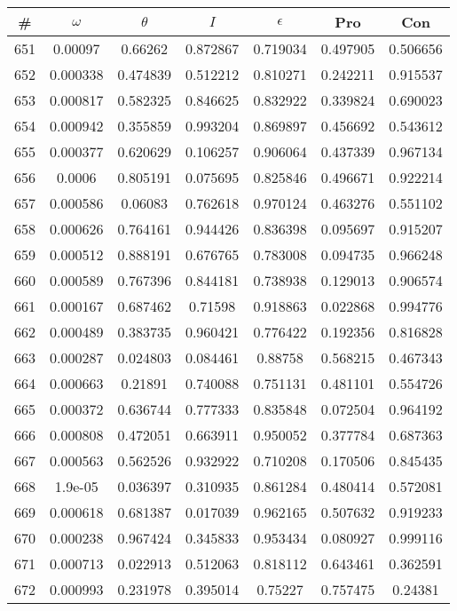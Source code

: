 \newpage
\begin{table}
\begin{tabular}{c|c|c|c|c|c|c}
\# & $\omega$ & $\theta$ & $I$ & $\epsilon$ & Pro & Con\\
\hline
651 & 0.00097 & 0.66262 & 0.872867 & 0.719034 & 0.497905 & 0.506656\\
652 & 0.000338 & 0.474839 & 0.512212 & 0.810271 & 0.242211 & 0.915537\\
653 & 0.000817 & 0.582325 & 0.846625 & 0.832922 & 0.339824 & 0.690023\\
654 & 0.000942 & 0.355859 & 0.993204 & 0.869897 & 0.456692 & 0.543612\\
655 & 0.000377 & 0.620629 & 0.106257 & 0.906064 & 0.437339 & 0.967134\\
656 & 0.0006 & 0.805191 & 0.075695 & 0.825846 & 0.496671 & 0.922214\\
657 & 0.000586 & 0.06083 & 0.762618 & 0.970124 & 0.463276 & 0.551102\\
658 & 0.000626 & 0.764161 & 0.944426 & 0.836398 & 0.095697 & 0.915207\\
659 & 0.000512 & 0.888191 & 0.676765 & 0.783008 & 0.094735 & 0.966248\\
660 & 0.000589 & 0.767396 & 0.844181 & 0.738938 & 0.129013 & 0.906574\\
661 & 0.000167 & 0.687462 & 0.71598 & 0.918863 & 0.022868 & 0.994776\\
662 & 0.000489 & 0.383735 & 0.960421 & 0.776422 & 0.192356 & 0.816828\\
663 & 0.000287 & 0.024803 & 0.084461 & 0.88758 & 0.568215 & 0.467343\\
664 & 0.000663 & 0.21891 & 0.740088 & 0.751131 & 0.481101 & 0.554726\\
665 & 0.000372 & 0.636744 & 0.777333 & 0.835848 & 0.072504 & 0.964192\\
666 & 0.000808 & 0.472051 & 0.663911 & 0.950052 & 0.377784 & 0.687363\\
667 & 0.000563 & 0.562526 & 0.932922 & 0.710208 & 0.170506 & 0.845435\\
668 & 1.9e-05 & 0.036397 & 0.310935 & 0.861284 & 0.480414 & 0.572081\\
669 & 0.000618 & 0.681387 & 0.017039 & 0.962165 & 0.507632 & 0.919233\\
670 & 0.000238 & 0.967424 & 0.345833 & 0.953434 & 0.080927 & 0.999116\\
671 & 0.000713 & 0.022913 & 0.512063 & 0.818112 & 0.643461 & 0.362591\\
672 & 0.000993 & 0.231978 & 0.395014 & 0.75227 & 0.757475 & 0.24381\\

\end{tabular}
\end{table}
